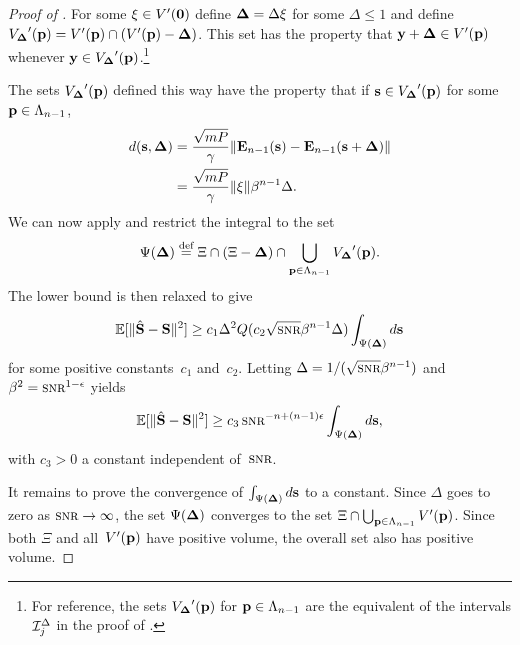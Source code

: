 \begin{subappendices}
\begin{proof}[Proof of ]
    For some $\mathbf{\xi} \in V'(\mathbf{0})$ define $\mathbf{\Delta} = \Delta \mathbf{\xi}$ for some $\Delta \le
    1$ and define ${V_{\mathbf{\Delta}}}'(\mathbf{p}) = V'(\mathbf{p}) \cap (V'(\mathbf{p}) - \mathbf{\Delta})$. This set has the
    property that $\mathbf{y} + \mathbf{\Delta} \in V'(\mathbf{p})$ whenever $\mathbf{y} \in {V_{\mathbf{\Delta}}}'(\mathbf{p})$.\footnote{For
    reference, the sets ${V_{\mathbf{\Delta}}}'(\mathbf{p})$ for $\mathbf{p} \in {\Lambda_{n-1}}$ are the equivalent of the
    intervals $\mathcal{I}_j^{\Delta}$ in the proof of .}

    The sets ${V_{\mathbf{\Delta}}}'(\mathbf{p})$ defined this way have the property that if $\mathbf{s} \in
    {V_{\mathbf{\Delta}}}'(\mathbf{p})$ for some $\mathbf{p} \in {\Lambda_{n-1}}$,
    \begin{align*}
      d(\mathbf{s},\mathbf{\Delta}) &= \frac{\sqrt{mP}}{\gamma} \| \mathbf{E}_{n-1}(\mathbf{s}) - \mathbf{E}_{n-1}(\mathbf{s} +
      \mathbf{\Delta}) \| \\
      &= \frac{\sqrt{mP}}{\gamma} \| \mathbf{\xi} \| \beta^{n-1} \Delta.
    \end{align*}
    We can now apply  and restrict the integral to the set
    \[ \Psi(\mathbf{\Delta}) \stackrel{\text{def}}{=} \Xi \cap (\Xi - \mathbf{\Delta}) \cap \bigcup_{\mathbf{p} \in {\Lambda_{n-1}}} {V_{\mathbf{\Delta}}}'(\mathbf{p}).
    \]
    The lower bound is then relaxed to give
    \begin{equation*}
      \msev \ge c_1 \Delta^2 Q(c_2 \sqrt{\snr} \beta^{n-1} \Delta) 
      \int_{\Psi(\Dv)} d\s
    \end{equation*}
    for some positive constants~$c_1$ and~$c_2$. Letting $\Delta =
    1/(\sqrt{\snr} \beta^{n-1})$ and $\beta^2 = \snr^{1-\e}$ yields
    \begin{equation*}
      \msev \ge c_3 \snr^{-n+(n-1)\e} \int_{\Psi(\Dv)} d\s,
    \end{equation*}
    with $c_3 > 0$ a constant independent of~$\snr$.

    It remains to prove the convergence of $\int_{\Psi(\mathbf{\Delta})} d\mathbf{s}$ to a constant.
    Since $\Delta$ goes to zero as $\snr \goesto \infty$, the set $\Psi(\mathbf{\Delta})$
    converges to the set $\Xi \cap \bigcup_{\mathbf{p} \in {\Lambda_{n-1}}} V'(\mathbf{p})$. Since both
    $\Xi$ and all~$V'(\mathbf{p})$ have positive volume, the overall set also has
    positive volume.
  \end{proof}



\end{subappendices}
